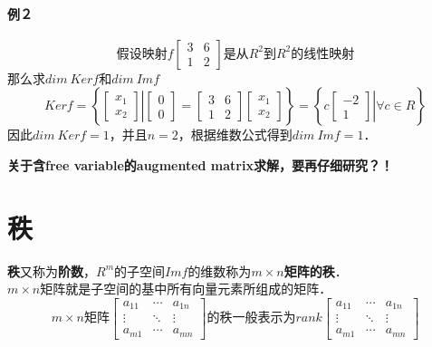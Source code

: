 \documentclass[12pt]{article}
\begin{document}
\begin{CJK}{UTF8}{gbsn}
\paragraph{例２}
\begin{equation}
\text{假设映射}f\left[\begin{array}{cc}
3 & 6\\
1 & 2
\end{array}
\right]\text{是从}R^2\text{到}R^2\text{的线性映射}
\end{equation}
那么求$dim\ Kerf$和$dim\ Imf$
\begin{equation}
Kerf = \left\lbrace
\left[
\left.
\begin{array}{c}
x_1\\x_2
\end{array}
\right]
\right|
\left[
\begin{array}{c}
0\\0
\end{array}
\right]
=
\left[
\begin{array}{cc}
3 & 6\\
1 & 2
\end{array}
\right]
\left[
\begin{array}{c}
x_1\\x_2
\end{array}
\right]
\right\rbrace
=
\left\lbrace
c\left.\left[
\begin{array}{c}
-2\\1
\end{array}
\right]
\right| \forall c \in R
\right\rbrace
\end{equation}
因此$dim\ Kerf=1$，并且$n=2$，根据维数公式得到$dim\ Imf=1$．

\textbf{关于含free variable的augmented matrix求解，要再仔细研究？！}

\section{秩}
\textbf{秩}又称为\textbf{阶数}，$R^m$的子空间$Imf$的维数称为\textbf{$m \times n$矩阵的秩}．\\
$m \times n$矩阵就是子空间的基中所有向量元素所组成的矩阵．
\begin{equation}
m \times n\text{矩阵}\left[
\begin{array}{ccc}
a_{11} & \cdots & a_{1n}\\
\vdots & \ddots & \vdots\\
a_{m1} & \cdots & a_{mn}
\end{array}
\right]
\text{的秩一般表示为}
rank\left[
\begin{array}{ccc}
a_{11} & \cdots & a_{1n}\\
\vdots & \ddots & \vdots\\
a_{m1} & \cdots & a_{mn}
\end{array}
\right]
\end{equation}

\end{CJK}
\end{document}
